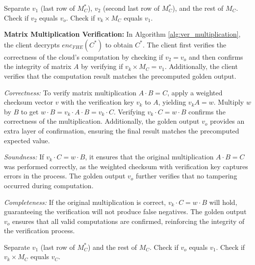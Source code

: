 \label{s:verification}
\begin{algorithm}
\caption{Matrix Multiplication Evaluation in DataSeal}
\label{alg:ver_multiplication}
\begin{algorithmic}[1]
\STATE Separate $v_1$ (last row of $M_C^*$), $v_2$ (second last row of $M_C^*$), and the rest of $M_C$.
\STATE Check if $v_2$ equals $v_o$.
\STATE Check if $v_k \times M_C$ equals $v_1$.
\end{algorithmic}
\end{algorithm}

\noindent\textbf{Matrix Multiplication Verification:}
In Algorithm \ref{alg:ver_multiplication}, the client decrypts $enc_{FHE}(C^*)$ to obtain $C^*$. The client first verifies the correctness of the cloud's computation by checking if $v_2 = v_o$ and then confirms the integrity of matrix $A$ by verifying if $v_k \times M_C = v_1$. Additionally, the client verifies that the computation result matches the precomputed golden output.

\textit{Correctness:} To verify matrix multiplication \(A \cdot B = C\), apply a weighted checksum vector \(v\) with the verification key \(v_k\) to \(A\), yielding \(v_k A = w\). Multiply \(w\) by \(B\) to get \(w \cdot B = v_k \cdot A \cdot B = v_k \cdot C\). Verifying \(v_k \cdot C = w \cdot B\) confirms the correctness of the multiplication. Additionally, the golden output \(v_o\) provides an extra layer of confirmation, ensuring the final result matches the precomputed expected value.

\textit{Soundness:} If \(v_k \cdot C = w \cdot B\), it ensures that the original multiplication \(A \cdot B = C\) was performed correctly, as the weighted checksum with verification key captures errors in the process. The golden output \(v_o\) further verifies that no tampering occurred during computation.

\textit{Completeness:} If the original multiplication is correct, \(v_k \cdot C = w \cdot B\) will hold, guaranteeing the verification will not produce false negatives. The golden output \(v_o\) ensures that all valid computations are confirmed, reinforcing the integrity of the verification process.

\begin{algorithm}
\caption{Secure Matrix Addition in DataSeal}
\label{alg:ver_addition}
\begin{algorithmic}[1]
\STATE Separate $v_1$ (last row of $M_C^*$) and the rest of $M_C$.
\STATE Check if $v_o$ equals $v_1$.
\STATE Check if $v_k \times M_C$ equals $v_C$.
\end{algorithmic}
\end{algorithm}

